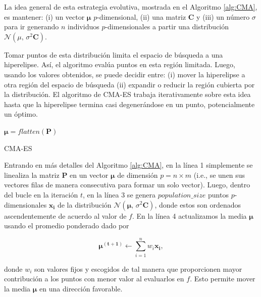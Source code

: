 La idea general de esta estrategia evolutiva, mostrada en el Algoritmo
\ref{alg:CMA}, es mantener:
(i) un vector $\boldsymbol{\mu}$ $p$-dimensional,
(ii) una matriz $\boldsymbol{C}$ y
(iii) un número $\sigma$ para ir generando $n$ individuos $p$-dimensionales
a partir una distribución $\mathcal{N}(\mu,\,\sigma^{2} \boldsymbol{C})$.


Tomar puntos de esta distribución limita el espacio de búsqueda a una
hiperelipse.
Así, el algoritmo evalúa puntos en esta región limitada.
Luego, usando los valores obtenidos, se puede decidir entre:
(i) mover la hiperelipse a otra región del espacio de búsqueda
(ii) expandir o reducir la región cubierta por la distribución.
El algoritmo de CMA-ES trabaja iterativamente sobre esta idea hasta que la
hiperelipse termina casi degenerándose en un punto, 
potencialmente un óptimo.

\begin{algorithm}
\KwResult{$\boldsymbol{\mu}$}
$\boldsymbol{\mu} = flatten(\boldsymbol{P})$ \\
\caption{CMA-ES}
\label{alg:CMA}
\end{algorithm}


Entrando en más detalles del Algoritmo \ref{alg:CMA},
en la línea 1 simplemente se linealiza la matriz $\boldsymbol{P}$ en un vector $\boldsymbol{\mu}$ 
de dimensión $p = n \times m$ (i.e., se unen sus vectores filas de manera consecutiva para formar un solo vector).
Luego, dentro del bucle en la iteración $t$, en la línea 3 se genera $population\_size$ puntos
$p$-dimensionales $\boldsymbol{x_i}$ de la distribución $\mathcal{N}(\boldsymbol{\mu},\,\sigma^{2} \boldsymbol{C})$, 
donde estos son ordenados ascendentemente de acuerdo
al valor de $f$.
En la línea 4 actualizamos la media $\boldsymbol{\mu}$ usando el promedio ponderado dado
por

\begin{equation}
  \boldsymbol{\mu^{(t + 1)}} \gets \sum_{i=1}^{n} w_i \boldsymbol{x_i},
\label{cma-average}
\end{equation}

donde $w_i$ son valores fijos y escogidos de tal manera que proporcionen mayor
contribución a los puntos con menor valor al evaluarlos en $f$. 
Esto permite mover la media $\boldsymbol{\mu}$ en una dirección favorable.

